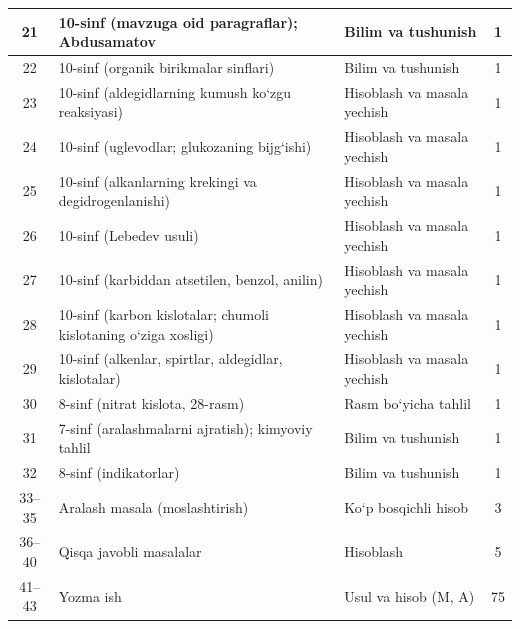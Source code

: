 \documentclass[11pt,a4paper]{article}
\begin{document}
{\begin{longtable}{|c|p{7.2cm}|p{5.4cm}|c|}
21 & 10-sinf (mavzuga oid paragraflar); Abdusamatov & Bilim va tushunish & 1\\\hline
22 & 10-sinf (organik birikmalar sinflari) & Bilim va tushunish & 1\\\hline
23 & 10-sinf (aldegidlarning kumush ko`zgu reaksiyasi) & Hisoblash va masala yechish & 1\\\hline
24 & 10-sinf (uglevodlar; glukozaning bijg`ishi) & Hisoblash va masala yechish & 1\\\hline
25 & 10-sinf (alkanlarning krekingi va degidrogenlanishi) & Hisoblash va masala yechish & 1\\\hline
26 & 10-sinf (Lebedev usuli) & Hisoblash va masala yechish & 1\\\hline
27 & 10-sinf (karbiddan atsetilen, benzol, anilin) & Hisoblash va masala yechish & 1\\\hline
28 & 10-sinf (karbon kislotalar; chumoli kislotaning o`ziga xosligi) & Hisoblash va masala yechish & 1\\\hline
29 & 10-sinf (alkenlar, spirtlar, aldegidlar, kislotalar) & Hisoblash va masala yechish & 1\\\hline
30 & 8-sinf (nitrat kislota, 28-rasm) & Rasm bo`yicha tahlil & 1\\\hline
31 & 7-sinf (aralashmalarni ajratish); kimyoviy tahlil & Bilim va tushunish & 1\\\hline
32 & 8-sinf (indikatorlar) & Bilim va tushunish & 1\\\hline
33--35 & Aralash masala (moslashtirish) & Ko`p bosqichli hisob & 3\\\hline
36--40 & Qisqa javobli masalalar & Hisoblash & 5\\\hline
41--43 & Yozma ish & Usul va hisob (M, A) & 75\\\hline
\end{longtable}}
\end{document}

